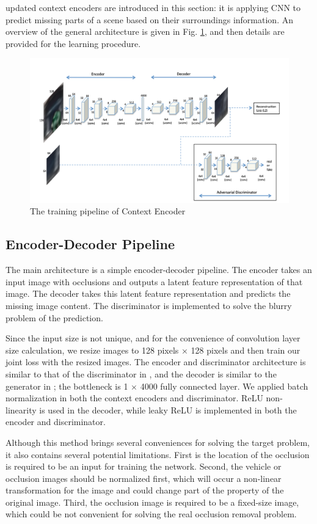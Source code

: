 updated context encoders are introduced in this section: it is applying CNN to predict missing parts of a scene based on their surroundings information. An overview of the general architecture is given in Fig. \ref{fig:pipline}, and then details are provided for the learning procedure.
\begin{figure}[!ht]
	\centering
	\includegraphics[width=0.9\linewidth]{contents/training pipeline.png}
	\caption{The training pipeline of Context Encoder}
    \label{fig:pipline}
\end{figure}

\subsection{Encoder-Decoder Pipeline}
The main architecture is a simple encoder-decoder pipeline. The encoder takes an input image with occlusions and outputs a latent feature representation of that image. The decoder takes this latent feature representation and predicts the missing image content. The discriminator is implemented to solve the blurry problem of the prediction.

Since the input size is not unique, and for the convenience of convolution layer size calculation, we resize images to 128 pixels × 128 pixels and then train our joint loss with the resized images. The encoder and discriminator architecture is similar to that of the discriminator in \cite{urldcgan}, and the decoder is similar to the generator in \cite{urldcgan}; the bottleneck is 1 $\times$ 4000 fully connected layer. We applied batch normalization in both the context encoders and discriminator. ReLU \cite{Gonzalez2007} non-linearity is used in the decoder, while leaky ReLU \cite{urldcgan} is implemented in both the encoder and discriminator.

Although this method brings several conveniences for solving the target problem, it also contains several potential limitations. First is the location of the occlusion is required to be an input for training the network. Second, the vehicle or occlusion images should be normalized first, which will occur a non-linear transformation for the image and could change part of the property of the original image. Third, the occlusion image is required to be a fixed-size image, which could be not convenient for solving the real occlusion removal problem.
